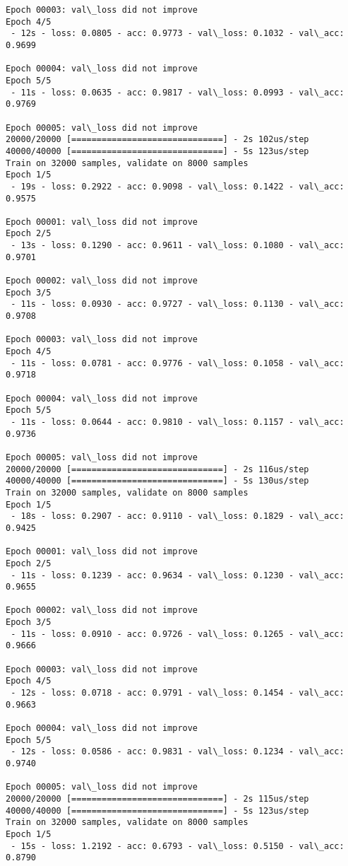 \documentclass[11pt]{article}
\begin{document}
\begin{Verbatim}[commandchars=\\\{\}]
Epoch 00003: val\_loss did not improve
Epoch 4/5
 - 12s - loss: 0.0805 - acc: 0.9773 - val\_loss: 0.1032 - val\_acc: 0.9699

Epoch 00004: val\_loss did not improve
Epoch 5/5
 - 11s - loss: 0.0635 - acc: 0.9817 - val\_loss: 0.0993 - val\_acc: 0.9769

Epoch 00005: val\_loss did not improve
20000/20000 [==============================] - 2s 102us/step
40000/40000 [==============================] - 5s 123us/step
Train on 32000 samples, validate on 8000 samples
Epoch 1/5
 - 19s - loss: 0.2922 - acc: 0.9098 - val\_loss: 0.1422 - val\_acc: 0.9575

Epoch 00001: val\_loss did not improve
Epoch 2/5
 - 13s - loss: 0.1290 - acc: 0.9611 - val\_loss: 0.1080 - val\_acc: 0.9701

Epoch 00002: val\_loss did not improve
Epoch 3/5
 - 11s - loss: 0.0930 - acc: 0.9727 - val\_loss: 0.1130 - val\_acc: 0.9708

Epoch 00003: val\_loss did not improve
Epoch 4/5
 - 11s - loss: 0.0781 - acc: 0.9776 - val\_loss: 0.1058 - val\_acc: 0.9718

Epoch 00004: val\_loss did not improve
Epoch 5/5
 - 11s - loss: 0.0644 - acc: 0.9810 - val\_loss: 0.1157 - val\_acc: 0.9736

Epoch 00005: val\_loss did not improve
20000/20000 [==============================] - 2s 116us/step
40000/40000 [==============================] - 5s 130us/step
Train on 32000 samples, validate on 8000 samples
Epoch 1/5
 - 18s - loss: 0.2907 - acc: 0.9110 - val\_loss: 0.1829 - val\_acc: 0.9425

Epoch 00001: val\_loss did not improve
Epoch 2/5
 - 11s - loss: 0.1239 - acc: 0.9634 - val\_loss: 0.1230 - val\_acc: 0.9655

Epoch 00002: val\_loss did not improve
Epoch 3/5
 - 11s - loss: 0.0910 - acc: 0.9726 - val\_loss: 0.1265 - val\_acc: 0.9666

Epoch 00003: val\_loss did not improve
Epoch 4/5
 - 12s - loss: 0.0718 - acc: 0.9791 - val\_loss: 0.1454 - val\_acc: 0.9663

Epoch 00004: val\_loss did not improve
Epoch 5/5
 - 12s - loss: 0.0586 - acc: 0.9831 - val\_loss: 0.1234 - val\_acc: 0.9740

Epoch 00005: val\_loss did not improve
20000/20000 [==============================] - 2s 115us/step
40000/40000 [==============================] - 5s 123us/step
Train on 32000 samples, validate on 8000 samples
Epoch 1/5
 - 15s - loss: 1.2192 - acc: 0.6793 - val\_loss: 0.5150 - val\_acc: 0.8790


\end{Verbatim}
\end{document}

